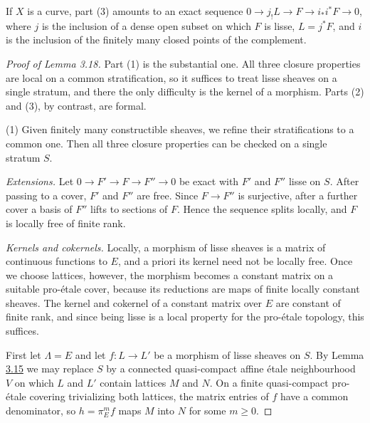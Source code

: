 \documentclass[11pt]{article}
\begin{document}
\label{bp57}%
If \(X\) is a curve, part (3) amounts to an exact sequence \(0\to j_!L\to F\to i_*i^*F\to0\), where \(j\) is the inclusion of a dense open subset on which \(F\) is lisse, \(L=j^*F\), and \(i\) is the inclusion of the finitely many closed points of the complement.

\begin{proof}[{Proof of Lemma 3.18}]\label{bp58}%
Part (1) is the substantial one. All three closure properties are local on a common stratification, so it suffices to treat lisse sheaves on a single stratum, and there the only difficulty is the kernel of a morphism. Parts (2) and (3), by contrast, are formal.

(1) Given finitely many constructible sheaves, we refine their stratifications to a common one. Then all three closure properties can be checked on a single stratum \(S\).

\emph{Extensions.} Let \(0\to F'\to F\to F''\to0\) be exact with \(F'\) and \(F''\) lisse on \(S\). After passing to a cover, \(F'\) and \(F''\) are free. Since \(F\to F''\) is surjective, after a further cover a basis of \(F''\) lifts to sections of \(F\). Hence the sequence splits locally, and \(F\) is locally free of finite rank.

\emph{Kernels and cokernels.} Locally, a morphism of lisse sheaves is a matrix of continuous functions to \(E\), and a priori its kernel need not be locally free. Once we choose lattices, however, the morphism becomes a constant matrix on a suitable pro-étale cover, because its reductions are maps of finite locally constant sheaves. The kernel and cokernel of a constant matrix over \(E\) are constant of finite rank, and since being lisse is a local property for the pro-étale topology, this suffices.

First let \(\Lambda=E\) and let \(f:L\to L'\) be a morphism of lisse sheaves on \(S\). By Lemma \hyperref[bp48]{3.15} we may replace \(S\) by a connected quasi-compact affine étale neighbourhood \(V\) on which \(L\) and \(L'\) contain lattices \(M\) and \(N\). On a finite quasi-compact pro-étale covering trivializing both lattices, the matrix entries of \(f\) have a common denominator, so \(h=\pi_E^mf\) maps \(M\) into \(N\) for some \(m\ge0\).


\end{proof}
\end{document}
